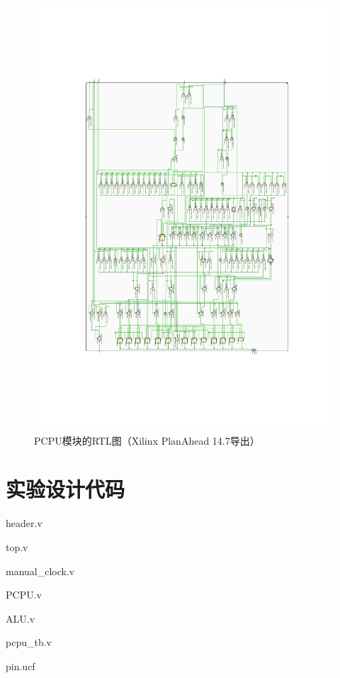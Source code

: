 \documentclass[10pt,a4paper,fleqn]{article}
\begin{document}
\newpage
\thispagestyle{empty}
\vspace{-2cm}
\begin{figure}[H]
  \hspace{-2cm}
  \includegraphics[width=1.2\textwidth]{figure/pcpuex.pdf}
  \caption{PCPU模块的RTL图（Xilinx PlanAhead 14.7导出）}
\end{figure}
\newpage
\section{实验设计代码}
header.v

\par top.v

\par manual\_clock.v

\par PCPU.v

\par ALU.v

\par pcpu\_tb.v

\par pin.ucf

\end{document}
